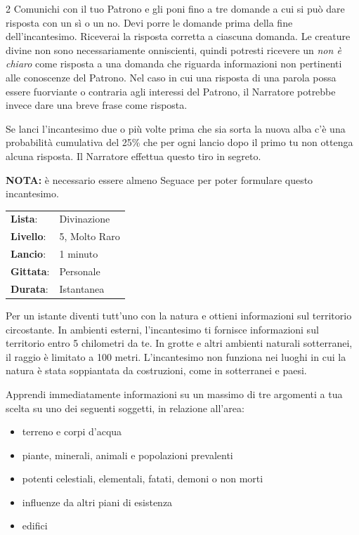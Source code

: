 \begin{multicols}{2}
Comunichi con il tuo Patrono e gli poni fino a tre domande a cui si può dare risposta con un sì o un no. Devi porre le domande prima della fine dell'incantesimo. Riceverai la risposta corretta a ciascuna domanda. Le creature divine non sono necessariamente onniscienti, quindi potresti ricevere un \emph{non è chiaro} come risposta a una domanda che riguarda informazioni non pertinenti alle conoscenze del Patrono. Nel caso in cui una risposta di una parola possa essere fuorviante o contraria agli interessi del Patrono, il Narratore potrebbe invece dare una breve frase come risposta.

Se lanci l'incantesimo due o più volte prima che sia sorta la nuova alba c'è una probabilità cumulativa del 25\% che per ogni lancio dopo il primo tu non ottenga alcuna risposta. Il Narratore effettua questo tiro in segreto.

\textbf{NOTA:} è necessario essere almeno Seguace per poter formulare questo incantesimo.

\noindent\begin{tabularx}{\linewidth}{p{1.9cm}X}
	\rowcolor{gray!20}\textbf{Lista}: & Divinazione \\
	\textbf{Livello}: & 5, Molto Raro \\
	\rowcolor{gray!20}\textbf{Lancio}: & 1 minuto \\
	\textbf{Gittata}: & Personale \\
	\rowcolor{gray!20}\textbf{Durata}: & Istantanea \\
\end{tabularx}\smallskip

Per un istante diventi tutt'uno con la natura e ottieni informazioni sul territorio circostante. In ambienti esterni, l'incantesimo ti fornisce informazioni sul territorio entro 5 chilometri da te. In grotte e altri ambienti naturali sotterranei, il raggio è limitato a 100 metri. L'incantesimo non funziona nei luoghi in cui la natura è stata soppiantata da costruzioni, come in sotterranei e paesi.

Apprendi immediatamente informazioni su un massimo di tre argomenti a tua scelta su uno dei seguenti soggetti, in relazione all'area:

\begin{itemize}\setlength{\itemsep}{-1pt}
	\item terreno e corpi d'acqua
	\item piante, minerali, animali e popolazioni prevalenti
	\item potenti celestiali, elementali, fatati, demoni o non morti
	\item influenze da altri piani di esistenza
	\item edifici
\end{itemize}


\end{multicols}

